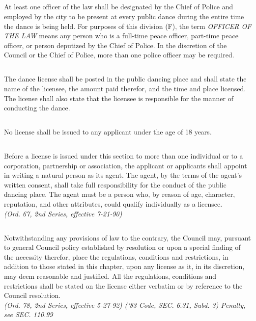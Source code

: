\subsection{}
At least one officer of the law shall be designated by the Chief of Police and employed by the city to be present at every public dance during the entire time the dance is being held.  For purposes of this division (F), the term \emph{OFFICER OF THE LAW} means any person who is a full-time peace officer, part-time peace officer, or person deputized by the Chief of Police.  In the discretion of the Council or the Chief of Police, more than one police officer may be required.
\subsection{}
The dance license shall be posted in the public dancing place and shall state the name of the licensee, the amount paid therefor, and the time and place licensed. The license shall also state that the licensee is responsible for the manner of conducting the dance.
\subsection{}
No license shall be issued to any applicant under the age of 18 years.
\subsection{}
Before a license is issued under this section to more than one individual or to a corporation, partnership or association, the applicant or applicants shall appoint in writing a natural person as its agent.  The agent, by the terms of the agent’s written consent, shall take full responsibility for the conduct of the public dancing place.  The agent must be a person who, by reason of age, character, reputation, and other attributes, could qualify individually as a licensee.\\
\emph{(Ord. 67, 2nd Series, effective 7-21-90)}
\subsection{}
Notwithstanding any provisions of law to the contrary, the Council may, pursuant to general Council policy established by resolution or upon a special finding of the necessity therefor, place the regulations, conditions and restrictions, in addition to those stated in this chapter, upon any license as it, in its discretion, may deem reasonable and justified.  All the regulations, conditions and restrictions shall be stated on the license either verbatim or by reference to the Council resolution.\\
\emph{(Ord. 78, 2nd Series, effective 5-27-92)  (‘83 Code, SEC. 6.31, Subd. 3)  Penalty, see SEC. 110.99}

